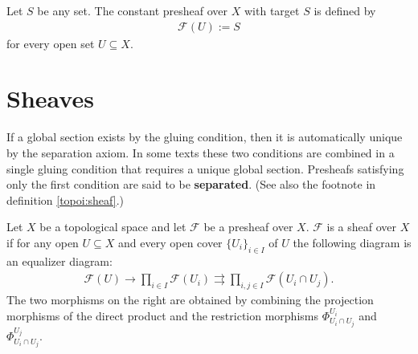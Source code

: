    \begin{example}\label{sheaf:constant_presheaf}
        Let $S$ be any set. The constant presheaf over $X$ with target $S$ is defined by
        \begin{gather}
            \mathcal{F}(U) := S
        \end{gather}
        for every open set $U\subseteq X$.
    \end{example}

\section{Sheaves}

    \begin{remark}
        If a global section exists by the gluing condition, then it is automatically unique by the separation axiom. In some texts these two conditions are combined in a single gluing condition that requires a unique global section. Presheafs satisfying only the first condition are said to be \textbf{separated}. (See also the footnote in definition \ref{topoi:sheaf}.)
    \end{remark}

    \begin{property}
        Let $X$ be a topological space and let $\mathcal{F}$ be a presheaf over $X$. $\mathcal{F}$ is a sheaf over $X$ if for any open $U\subseteq X$ and every open cover $\{U_i\}_{i\in I}$ of $U$ the following diagram is an equalizer diagram:
        \begin{gather}
            \label{sheaf:equalizer}
            \mathcal{F}(U)\rightarrow\prod_{i\in I}\mathcal{F}(U_i)\rightrightarrows\prod_{i, j\in I}\mathcal{F}(U_i\cap U_j).
        \end{gather}
        The two morphisms on the right are obtained by combining the projection morphisms of the direct product and the restriction morphisms $\Phi^{U_i}_{U_i\cap U_j}$ and $\Phi^{U_j}_{U_i\cap U_j}$.
    \end{property}

